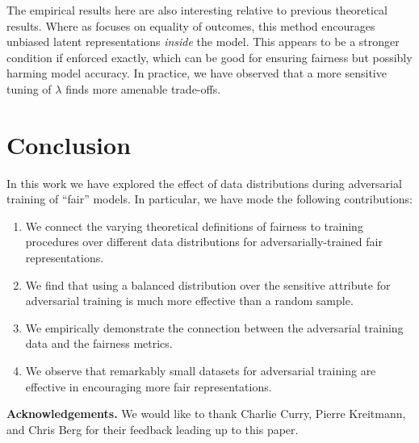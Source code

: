 \documentclass[sigconf,9pt]{acmart}
\begin{document}
The empirical results here are also interesting relative to previous theoretical results.  Where as \cite{hardt2016equality} focuses on equality of outcomes, this method encourages unbiased latent representations \emph{inside} the model.  This appears to be a stronger condition if enforced exactly, which can be good for ensuring fairness but possibly harming model accuracy. 
In practice, we have observed that a more sensitive tuning of $\lambda$ finds more amenable trade-offs.

\section{Conclusion}
In this work we have explored the effect of data distributions during adversarial training of ``fair'' models.
In particular, we have mode the following contributions:
\begin{enumerate}
    \item We connect the varying theoretical definitions of fairness to training procedures over different data distributions for adversarially-trained fair representations.
    \item We find that using a balanced distribution over the sensitive attribute for adversarial training is much more effective than a random sample. 
    \item We empirically demonstrate the connection between the adversarial training data and the fairness metrics.
    \item We observe that remarkably small datasets for adversarial training are effective in encouraging more fair representations.
\end{enumerate}

\vspace{1mm}
{\small
\noindent \textbf{Acknowledgements.} We would like to thank Charlie Curry, Pierre Kreitmann, and Chris Berg for their feedback leading up to this paper.
}

\newpage

 
\end{document}
